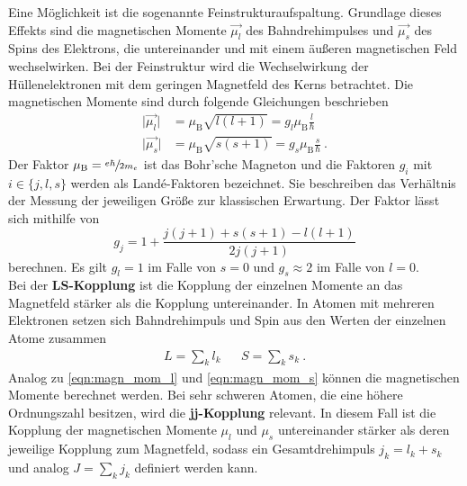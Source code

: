     Eine Möglichkeit ist die sogenannte Feinstrukturaufspaltung.
    Grundlage dieses Effekts sind die magnetischen Momente $\vec{\mu_l}$ des Bahndrehimpulses und $\vec{\mu_s}$ des Spins des Elektrons,
    die untereinander und mit einem äußeren magnetischen Feld wechselwirken.
    Bei der Feinstruktur wird die Wechselwirkung der Hüllenelektronen mit dem geringen Magnetfeld des Kerns betrachtet. %
    Die magnetischen Momente sind durch folgende Gleichungen beschrieben
    \begin{align}
        \lvert \vec{\mu_l} \rvert &= \mu_\text{B} \sqrt{l(l+1)} = g_l \mu_\text{B} \frac{l}{\hbar}
        \label{eqn:magn_mom_l} \\
        \lvert \vec{\mu_s} \rvert &= \mu_\text{B} \sqrt{s(s+1)} = g_s \mu_\text{B} \frac{s}{\hbar} \ .
        \label{eqn:magn_mom_s}
    \end{align}
    Der Faktor $\mu_\text{B} = \sfrac{e \hbar}{2 m_{e}}$ ist das Bohr'sche Magneton und die Faktoren $g_{i}$ mit $i \in \{j,l,s\}$ werden als Landé-Faktoren bezeichnet.
    Sie beschreiben das Verhältnis der Messung der jeweiligen Größe zur klassischen Erwartung.
    Der Faktor lässt sich mithilfe von
    \begin{equation}
        g_{j} = 1 + \frac{j(j+1) + s(s+1) - l(l+1)}{2j(j+1)}
        \label{eqn:lande}
    \end{equation}
    berechnen.
    Es gilt $g_l = 1$ im Falle von $s = 0$ und $g_s \approx 2$ im Falle von $l = 0$.\\
    Bei der \textbf{LS-Kopplung} ist die Kopplung der einzelnen Momente an das Magnetfeld stärker als die Kopplung untereinander.
    In Atomen mit mehreren Elektronen setzen sich Bahndrehimpuls und Spin aus den Werten der einzelnen Atome zusammen
    \begin{align*}
        L = \sum_k l_k && S = \sum_k s_k \ .
    \end{align*}
    Analog zu \autoref{eqn:magn_mom_l} und \autoref{eqn:magn_mom_s} können die magnetischen Momente berechnet werden.
    Bei sehr schweren Atomen,
    die eine höhere Ordnungszahl besitzen,
    wird die \textbf{jj-Kopplung} relevant.
    In diesem Fall ist die Kopplung der magnetischen Momente $\mu_l$ und $\mu_s$ untereinander
    stärker als deren jeweilige Kopplung zum Magnetfeld,
    sodass ein Gesamtdrehimpuls $j_k = l_k + s_k$ und analog $J = \sum_k j_k$ definiert werden kann.



